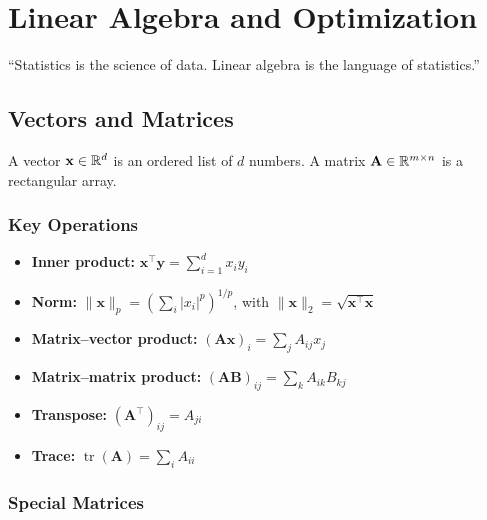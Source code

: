 \chapter{Linear Algebra and Optimization}
\label{ch:linear-algebra}

\epigraph{``Statistics is the science of data. Linear algebra is the language of statistics.''}{}


\section{Vectors and Matrices}

A vector $\mathbf{x} \in \mathbb{R}^d$ is an ordered list of $d$ numbers. A matrix $\mathbf{A} \in \mathbb{R}^{m \times n}$ is a rectangular array.

\subsection{Key Operations}

\begin{itemize}
	\item \textbf{Inner product:} $\mathbf{x}^\top \mathbf{y} = \sum_{i=1}^d x_i y_i$
	\item \textbf{Norm:} $\|\mathbf{x}\|_p = (\sum_i |x_i|^p)^{1/p}$, with $\|\mathbf{x}\|_2 = \sqrt{\mathbf{x}^\top \mathbf{x}}$
	\item \textbf{Matrix--vector product:} $(\mathbf{A}\mathbf{x})_i = \sum_j A_{ij} x_j$
	\item \textbf{Matrix--matrix product:} $(\mathbf{A}\mathbf{B})_{ij} = \sum_k A_{ik} B_{kj}$
	\item \textbf{Transpose:} $(\mathbf{A}^\top)_{ij} = A_{ji}$
	\item \textbf{Trace:} $\operatorname{tr}(\mathbf{A}) = \sum_i A_{ii}$
\end{itemize}

\subsection{Special Matrices}

